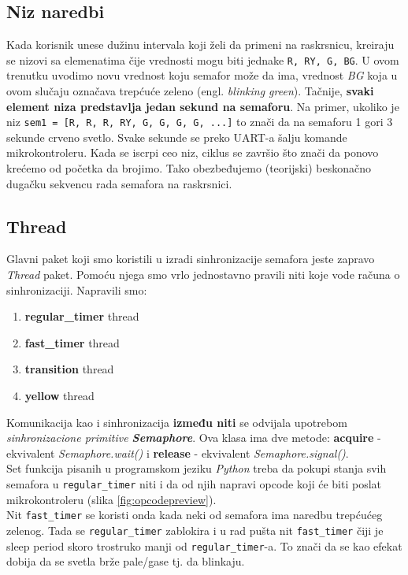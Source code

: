 \documentclass[a4paper,12pt, projekat]{etf}
\begin{document}
\subsection{Niz naredbi}
Kada korisnik unese dužinu intervala koji želi da primeni na raskrsnicu, kreiraju se nizovi sa elemenatima čije vrednosti mogu biti jednake \verb|R, RY, G, BG|. U ovom trenutku uvodimo novu vrednost koju semafor može da ima, vrednost \textit{BG} koja u ovom slučaju označava trepćuće zeleno (engl. \textit{blinking green}). Tačnije, \textbf{svaki element niza predstavlja jedan sekund na semaforu}. Na primer, ukoliko je niz \verb|sem1 = [R, R, R, RY, G, G, G, G, ...]| to znači da na semaforu 1 gori 3 sekunde crveno svetlo. Svake sekunde se preko UART-a šalju komande mikrokontroleru. Kada se iscrpi ceo niz, ciklus se završio što znači da ponovo krećemo od početka da brojimo. Tako obezbeđujemo (teorijski) beskonačno dugačku sekvencu rada semafora na raskrsnici.

\subsection{Thread}
\label{title:Thread}
Glavni paket koji smo koristili u izradi sinhronizacije semafora jeste zapravo \textit{Thread} paket. Pomoću njega smo vrlo jednostavno pravili niti koje vode računa o sinhronizaciji. Napravili smo:
\begin{enumerate}
\item \textbf{regular\_timer} thread
\item \textbf{fast\_timer} thread
\item \textbf{transition} thread
\item \textbf{yellow} thread
\end{enumerate}
Komunikacija kao i sinhronizacija \textbf{između niti} se odvijala upotrebom \textit{sinhronizacione primitive \textbf{Semaphore}}. Ova klasa ima dve metode: \textbf{acquire} - ekvivalent \textit{Semaphore.wait()} i \textbf{release} - ekvivalent \textit{Semaphore.signal()}.\\

Set funkcija pisanih u programskom jeziku \textit{Python} treba da pokupi stanja svih semafora u \verb|regular_timer| niti i da od njih napravi opcode koji će biti poslat mikrokontroleru (slika \ref{fig:opcodepreview}).\\

Nit \verb|fast_timer| se koristi onda kada neki od semafora ima naredbu trepćućeg zelenog. Tada se \verb|regular_timer| zablokira i u rad pušta nit \verb|fast_timer| čiji je sleep period skoro trostruko manji od \verb|regular_timer|-a. To znači da se kao efekat dobija da se svetla brže pale/gase tj. da blinkaju.\\
\end{document}
